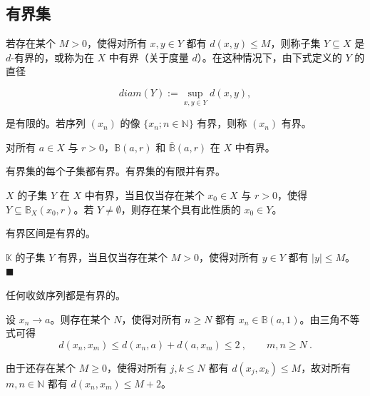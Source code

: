 \subsection*{有界集}

若存在某个  $ M > 0 $，使得对所有  $ x, y \in Y $ 都有  $ d(x, y) \leq M $，则称子集  $ Y \subseteq X $ 是  $ d $-有界的，或称为在  $ X $ 中有界（关于度量  $ d $）。在这种情况下，由下式定义的  $ Y $ 的直径

\[
diam(Y):=\sup_{x,y\in Y}d(x,y),
\]

是有限的。若序列  $ (x_n) $ 的像  $ \{x_n; n \in \mathbb{N}\} $ 有界，则称  $ (x_n) $ 有界。

\begin{example}

\begin{items}
\item

对所有  $ a \in X $ 与  $ r > 0 $，$ \mathbb{B}(a, r) $ 和  $ \bar{\mathbb{B}}(a, r) $ 在  $ X $ 中有界。

\item

有界集的每个子集都有界。有界集的有限并有界。

\item

$ X $ 的子集  $ Y $ 在  $ X $ 中有界，当且仅当存在某个  $ x_0 \in X $ 与  $ r > 0 $，使得  $ Y \subseteq \mathbb{B}_X(x_0, r) $。若  $ Y \neq \emptyset $，则存在某个具有此性质的  $ x_0 \in Y $。

\item

有界区间是有界的。

\item

$ \mathbb{K} $ 的子集  $ Y $ 有界，当且仅当存在某个  $ M > 0 $，使得对所有  $ y \in Y $ 都有  $ |y| \leq M $。 $ \blacksquare $

\end{items}

\end{example}

\begin{proposition}

任何收敛序列都是有界的。

\proofhead
设  $ x_n \to a $。则存在某个  $ N $，使得对所有  $ n \geq N $ 都有  $ x_n \in \mathbb{B}(a,1) $。由三角不等式可得
\[
d(x_{n},x_{m})\leq d(x_{n},a)+d(a,x_{m})\leq2~,\qquad m,n\geq N~.
\]

由于还存在某个 $M \geq 0$，使得对所有 $j, k \leq N$ 都有 $d(x_j, x_k) \leq M$，故对所有 $m, n \in \mathbb{N}$ 都有 $d(x_n, x_m) \leq M + 2$。

\end{proposition}


